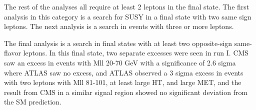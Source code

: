 
The rest of the analyses all require at least 2 leptons in the final state.
The first analysis in this category is a search for SUSY in a final state with two same sign leptons.
The next analysis is a search in events with three or more leptons.

The final analysis is a search in final states with at least two opposite-sign same-flavor leptons.
In this final state, two separate excesses were seen in run I.
CMS saw an excess in events with Mll 20-70 GeV with a significance of 2.6 sigma where ATLAS saw no excess,
and ATLAS observed a 3 sigma excess in events with two leptons with Mll 81-101, at least large HT, and large MET,
and the result from CMS in a similar signal region showed no significant deviation from the SM prediction.
